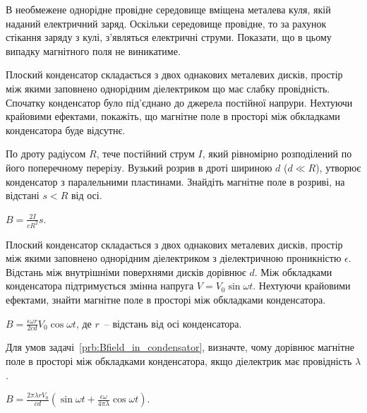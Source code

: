 \begin{problem}
В необмежене однорідне провідне середовище вміщена металева куля, якій наданий електричний заряд. Оскільки середовище провідне, то за рахунок стікання заряду з кулі, з'являться електричні струми. Показати, що в цьому випадку магнітного поля не виникатиме.
\end{problem}

\begin{problem}
Плоский конденсатор складається з двох однакових металевих дисків, простір між якими заповнено однорідним діелектриком що має слабку провідність. Спочатку конденсатор було під'єднано до джерела постійної напрури. Нехтуючи крайовими ефектами, покажіть, що магнітне поле в просторі між обкладками конденсатора буде відсутнє.
\end{problem}

\begin{problem}\label{prb:Griffiths7.34}
По дроту радіусом $R$, тече постійний струм $I$, який рівномірно розподілений по його поперечному перерізу. Вузький розрив в дроті шириною $d$ ($d \ll R$), утворює конденсатор з паралельними пластинами. Знайдіть магнітне поле в розриві, на відстані $s < R$ від осі.
\begin{solution}
	$B = \frac{2I}{cR^2}s$.
\end{solution}
\end{problem}


\begin{problem}\label{prb:Bfield_in_condensator}
Плоский конденсатор складається з двох однакових металевих дисків, простір між якими заповнено однорідним діелектриком з діелектричною проникністю $\epsilon$. Відстань між внутрішніми поверхнями дисків дорівнює $d$. Між обкладками конденсатора підтримується змінна напруга $V = V_0\sin\omega t$. Нехтуючи крайовими ефектами, знайти магнітне поле в просторі між обкладками конденсатора.
\begin{solution}
	$B = \frac{\epsilon\omega r}{2cd}V_0\cos\omega t$, де $r$~-- відстань від осі конденсатора.
\end{solution}
 \end{problem}

\begin{problem}\label{prb:Bfield_in_condensator_with_currnet}
    Для умов задачі~\ref{prb:Bfield_in_condensator}, визначте, чому дорівнює  магнітне поле в просторі між обкладками конденсатора, якщо діелектрик має провідність $\lambda$.
\begin{solution}
	$B = \frac{2\pi\lambda r V_0}{cd}\left( \sin\omega t + \frac{\epsilon \omega}{4\pi\lambda}\cos\omega t\right) $.
\end{solution}
\end{problem}

